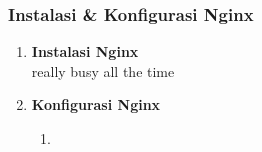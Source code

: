 \subsubsection{Instalasi \& Konfigurasi \textbf{Nginx}}

	\begin{enumerate}[label={}]
		
		\item \textbf{Instalasi \textbf{Nginx}}
			\\
			really busy all the time
		
		\item 
		\textbf{Konfigurasi \textbf{Nginx}}
		\\
			\begin{enumerate}[label=\roman*]
				\item \mylipsum
					  
				
			\end{enumerate}
	\end{enumerate}